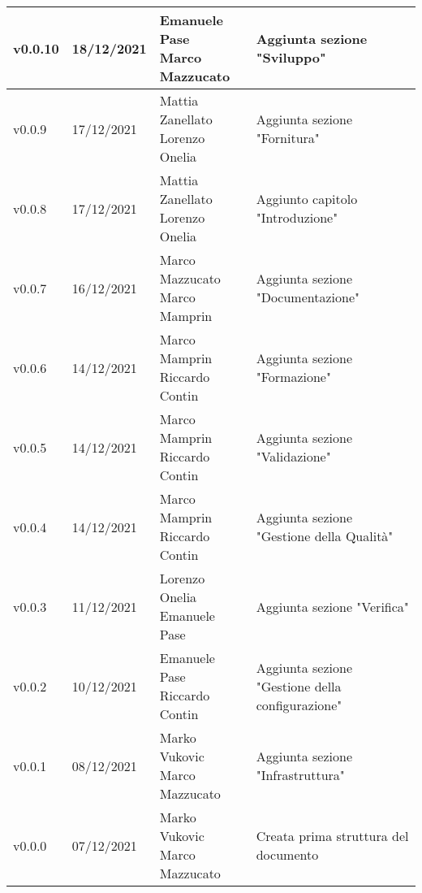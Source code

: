 \begin{center}
\begin{longtable}{|p{1.8cm}|p{2.2cm}|p{4.2cm}|p{4.6cm}|}
      v0.0.10           & 18/12/2021    & \aCapo{Emanuele Pase\\Marco Mazzucato} & Aggiunta sezione "Sviluppo" \\ \hline
      v0.0.9            & 17/12/2021    & \aCapo{Mattia Zanellato\\Lorenzo Onelia} & Aggiunta sezione "Fornitura" \\ \hline
      v0.0.8            & 17/12/2021    & \aCapo{Mattia Zanellato\\Lorenzo Onelia} & Aggiunto capitolo "Introduzione" \\ \hline
      v0.0.7            & 16/12/2021    & \aCapo{Marco Mazzucato\\Marco Mamprin} & Aggiunta sezione "Documentazione" \\ \hline
      v0.0.6            & 14/12/2021    & \aCapo{Marco Mamprin\\Riccardo Contin} & Aggiunta sezione "Formazione" \\ \hline
      v0.0.5            & 14/12/2021    & \aCapo{Marco Mamprin\\Riccardo Contin}   & Aggiunta sezione "Validazione" \\ \hline
      v0.0.4            & 14/12/2021    & \aCapo{Marco Mamprin\\Riccardo Contin}   & Aggiunta sezione "Gestione della Qualità" \\ \hline
      v0.0.3            & 11/12/2021    & \aCapo{Lorenzo Onelia\\Emanuele Pase} & Aggiunta sezione "Verifica" \\ \hline
      v0.0.2            & 10/12/2021    & \aCapo{Emanuele Pase\\Riccardo Contin}  & Aggiunta sezione "Gestione della configurazione" \\ \hline
      v0.0.1            & 08/12/2021    & \aCapo{Marko Vukovic\\Marco Mazzucato}   & Aggiunta sezione "Infrastruttura" \\ \hline
      v0.0.0            & 07/12/2021    & \aCapo{Marko Vukovic\\Marco Mazzucato}   & Creata prima struttura del documento \\ \hline
  \end{longtable}
\end{center}
